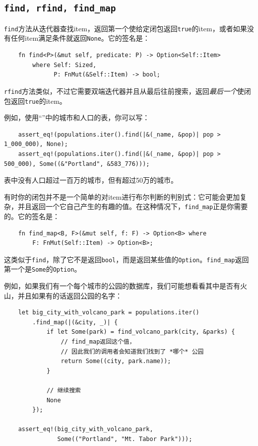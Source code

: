 \subsection{\texttt{find, rfind, find\_map}}
\texttt{find}方法从迭代器查找item，返回第一个使给定闭包返回\texttt{true}的item，或者如果没有任何item满足条件就返回\texttt{None}。它的签名是：
\begin{verbatim}
    fn find<P>(&mut self, predicate: P) -> Option<Self::Item>
        where Self: Sized,
              P: FnMut(&Self::Item) -> bool;
\end{verbatim}

\texttt{rfind}方法类似，不过它需要双端迭代器并且从最后往前搜索，返回\emph{最后一个}使闭包返回\texttt{true}的item。

例如，使用“”中的城市和人口的表，你可以写：
\begin{verbatim}
    assert_eq!(populations.iter().find(|&(_name, &pop)| pop > 1_000_000), None);
    assert_eq!(populations.iter().find(|&(_name, &pop)| pop > 500_000), Some((&"Portland", &583_776)));
\end{verbatim}

表中没有人口超过一百万的城市，但有超过50万的城市。

有时你的闭包并不是一个简单的对item进行布尔判断的判别式：它可能会更加复杂，并且返回一个它自己产生的有趣的值。在这种情况下，\texttt{find\_map}正是你需要的。它的签名是：
\begin{verbatim}
    fn find_map<B, F>(&mut self, f: F) -> Option<B> where
        F: FnMut(Self::Item) -> Option<B>;
\end{verbatim}

这类似于\texttt{find}，除了它不是返回\texttt{bool}，而是返回某些值的\texttt{Option}。\texttt{find\_map}返回第一个是\texttt{Some}的\texttt{Option}。

例如，如果我们有一个每个城市的公园的数据库，我们可能想看看其中是否有火山，并且如果有的话返回公园的名字：
\begin{verbatim}
    let big_city_with_volcano_park = populations.iter()
        .find_map(|(&city, _)| {
            if let Some(park) = find_volcano_park(city, &parks) {
                // find_map返回这个值，
                // 因此我们的调用者会知道我们找到了 *哪个* 公园
                return Some((city, park.name));
            }

            // 继续搜索
            None
        });

    assert_eq!(big_city_with_volcano_park,
               Some(("Portland", "Mt. Tabor Park")));
\end{verbatim}

